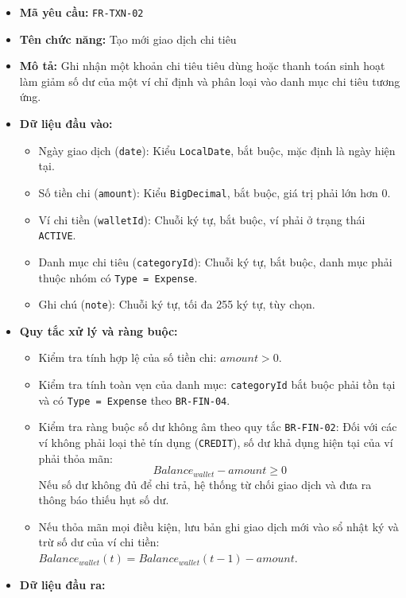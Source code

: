 \documentclass[11pt,a4paper]{article}
\providecommand{\tightlist}{
  \setlength{\itemsep}{0pt}\setlength{\parskip}{0pt}}
\begin{document}
\begin{itemize}
\tightlist
\item
  \textbf{Mã yêu cầu:} \texttt{FR-TXN-02}
\item
  \textbf{Tên chức năng:} Tạo mới giao dịch chi tiêu
\item
  \textbf{Mô tả:} Ghi nhận một khoản chi tiêu tiêu dùng hoặc thanh toán
  sinh hoạt làm giảm số dư của một ví chỉ định và phân loại vào danh mục
  chi tiêu tương ứng.
\item
  \textbf{Dữ liệu đầu vào:}

  \begin{itemize}
  \tightlist
  \item
    Ngày giao dịch (\texttt{date}): Kiểu \texttt{LocalDate}, bắt buộc,
    mặc định là ngày hiện tại.
  \item
    Số tiền chi (\texttt{amount}): Kiểu \texttt{BigDecimal}, bắt buộc,
    giá trị phải lớn hơn 0.
  \item
    Ví chi tiền (\texttt{walletId}): Chuỗi ký tự, bắt buộc, ví phải ở
    trạng thái \texttt{ACTIVE}.
  \item
    Danh mục chi tiêu (\texttt{categoryId}): Chuỗi ký tự, bắt buộc, danh
    mục phải thuộc nhóm có \texttt{Type\ =\ Expense}.
  \item
    Ghi chú (\texttt{note}): Chuỗi ký tự, tối đa 255 ký tự, tùy chọn.
  \end{itemize}
\item
  \textbf{Quy tắc xử lý và ràng buộc:}

  \begin{itemize}
  \tightlist
  \item
    Kiểm tra tính hợp lệ của số tiền chi: \(amount > 0\).
  \item
    Kiểm tra tính toàn vẹn của danh mục: \texttt{categoryId} bắt buộc
    phải tồn tại và có \texttt{Type\ =\ Expense} theo
    \texttt{BR-FIN-04}.
  \item
    Kiểm tra ràng buộc số dư không âm theo quy tắc \texttt{BR-FIN-02}:
    Đối với các ví không phải loại thẻ tín dụng (\texttt{CREDIT}), số dư
    khả dụng hiện tại của ví phải thỏa mãn:
    \[Balance_{wallet} - amount \ge 0\] Nếu số dư không đủ để chi trả,
    hệ thống từ chối giao dịch và đưa ra thông báo thiếu hụt số dư.
  \item
    Nếu thỏa mãn mọi điều kiện, lưu bản ghi giao dịch mới vào sổ nhật ký
    và trừ số dư của ví chi tiền:
    \(Balance_{wallet}(t) = Balance_{wallet}(t-1) - amount\).
  \end{itemize}
\item
  \textbf{Dữ liệu đầu ra:}


\end{itemize}
\end{document}
